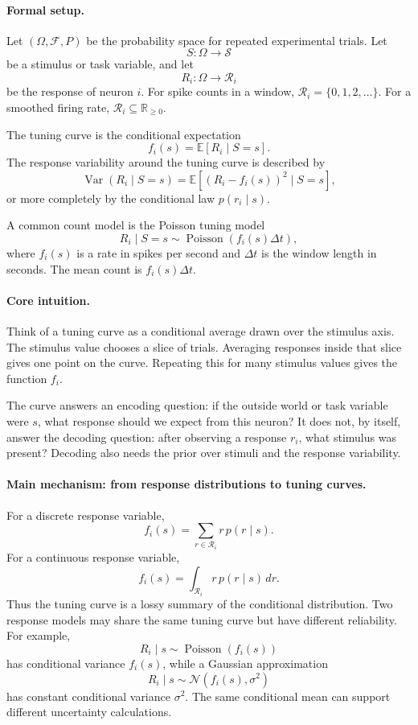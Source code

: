 \paragraph{Formal setup.}
Let \((\Omega,\mathcal F,P)\) be the probability space for repeated experimental trials. Let
\[
S:\Omega\to\mathcal S
\]
be a stimulus or task variable, and let
\[
R_i:\Omega\to\mathcal R_i
\]
be the response of neuron \(i\). For spike counts in a window, \(\mathcal R_i=\{0,1,2,\ldots\}\). For a smoothed firing rate, \(\mathcal R_i\subseteq\mathbb R_{\geq0}\).

The tuning curve is the conditional expectation
\[
\boxed{
f_i(s)=\mathbb E[R_i\mid S=s].
}
\]
The response variability around the tuning curve is described by
\[
\operatorname{Var}(R_i\mid S=s)
=\mathbb E[(R_i-f_i(s))^2\mid S=s],
\]
or more completely by the conditional law \(p(r_i\mid s)\).

A common count model is the Poisson tuning model
\[
R_i\mid S=s\sim \operatorname{Poisson}(f_i(s)\Delta t),
\]
where \(f_i(s)\) is a rate in spikes per second and \(\Delta t\) is the window length in seconds. The mean count is \(f_i(s)\Delta t\).

\paragraph{Core intuition.}
Think of a tuning curve as a conditional average drawn over the stimulus axis. The stimulus value chooses a slice of trials. Averaging responses inside that slice gives one point on the curve. Repeating this for many stimulus values gives the function \(f_i\).

The curve answers an encoding question: if the outside world or task variable were \(s\), what response should we expect from this neuron? It does not, by itself, answer the decoding question: after observing a response \(r_i\), what stimulus was present? Decoding also needs the prior over stimuli and the response variability.

\paragraph{Main mechanism: from response distributions to tuning curves.}
For a discrete response variable,
\[
f_i(s)=\sum_{r\in\mathcal R_i} r\,p(r\mid s).
\]
For a continuous response variable,
\[
f_i(s)=\int_{\mathcal R_i} r\,p(r\mid s)\,dr.
\]
Thus the tuning curve is a lossy summary of the conditional distribution. Two response models may share the same tuning curve but have different reliability. For example,
\[
R_i\mid s\sim\operatorname{Poisson}(f_i(s))
\]
has conditional variance \(f_i(s)\), while a Gaussian approximation
\[
R_i\mid s\sim\mathcal N(f_i(s),\sigma^2)
\]
has constant conditional variance \(\sigma^2\). The same conditional mean can support different uncertainty calculations.

